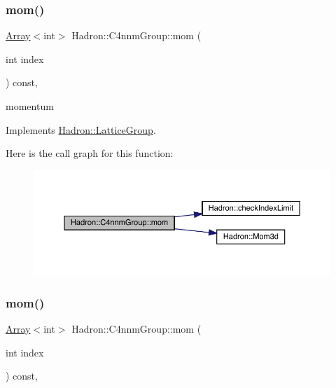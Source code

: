 \subsubsection{\texorpdfstring{mom()}{mom()}\hspace{0.1cm}{\footnotesize\ttfamily [1/3]}}
{\footnotesize\ttfamily \mbox{\hyperlink{classXMLArray_1_1Array}{Array}}$<$int$>$ Hadron\+::\+C4nnm\+Group\+::mom (\begin{DoxyParamCaption}\item[{int}]{index }\end{DoxyParamCaption}) const\hspace{0.3cm}{\ttfamily [inline]}, {\ttfamily [virtual]}}

momentum 

Implements \mbox{\hyperlink{structHadron_1_1LatticeGroup_ad577b65041dd9a6e84b1f3bd49cb8fce}{Hadron\+::\+Lattice\+Group}}.

Here is the call graph for this function\+:
\nopagebreak
\begin{figure}[H]
\begin{center}
\leavevmode
\includegraphics[width=350pt]{d1/dba/structHadron_1_1C4nnmGroup_a7553c7f91a8dc310b37b7b5da32e98f6_cgraph}
\end{center}
\end{figure}
\mbox{\label{structHadron_1_1C4nnmGroup_a7553c7f91a8dc310b37b7b5da32e98f6}} 
\subsubsection{\texorpdfstring{mom()}{mom()}\hspace{0.1cm}{\footnotesize\ttfamily [2/3]}}
{\footnotesize\ttfamily \mbox{\hyperlink{classXMLArray_1_1Array}{Array}}$<$int$>$ Hadron\+::\+C4nnm\+Group\+::mom (\begin{DoxyParamCaption}\item[{int}]{index }\end{DoxyParamCaption}) const\hspace{0.3cm}{\ttfamily [inline]}, {\ttfamily [virtual]}}

